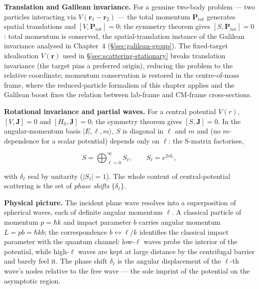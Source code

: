 \medskip\noindent\textbf{Translation and Galilean invariance.} For a genuine two-body problem --- two particles interacting via $V(\bm r_{1}-\bm r_{2})$ --- the total momentum $\bm P_{\mathrm{tot}}$ generates spatial translations and $[V,\bm P_{\mathrm{tot}}]=0$; the symmetry theorem gives $[S,\bm P_{\mathrm{tot}}]=0$: total momentum is conserved, the spatial-translation instance of the Galilean invariance analysed in Chapter~4 (\S\ref{sec:galilean-group}). The fixed-target idealisation $V(\bm r)$ used in \S\ref{sec:scattering-stationary} breaks translation invariance (the target pins a preferred origin), reducing the problem to the relative coordinate; momentum conservation is restored in the centre-of-mass frame, where the reduced-particle formalism of this chapter applies and the Galilean boost fixes the relation between lab-frame and CM-frame cross-sections.

\medskip\noindent\textbf{Rotational invariance and partial waves.} For a central potential $V(r)$, $[V,\bm J]=0$ and $[H_{0},\bm J]=0$; the symmetry theorem gives $[S,\bm J]=0$. In the angular-momentum basis $|E,\ell,m\rangle$, $S$ is diagonal in $\ell$ and $m$ and (no $m$-dependence for a scalar potential) depends only on $\ell$: the S-matrix factorises,
\begin{linenomath}
\begin{equation}
S=\bigoplus_{\ell=0}^{\infty}S_{\ell},\qquad S_{\ell}=e^{2i\delta_{\ell}},
\label{eq:Smatrix-partialwave}
\end{equation}
\end{linenomath}
with $\delta_{\ell}$ real by unitarity ($|S_{\ell}|=1$). The whole content of central-potential scattering is the set of \emph{phase shifts} $\{\delta_{\ell}\}$.

\medskip\noindent\textbf{Physical picture.} The incident plane wave resolves into a superposition of spherical waves, each of definite angular momentum $\ell$. A classical particle of momentum $p=\hbar k$ and impact parameter $b$ carries angular momentum $L=pb=\hbar kb$; the correspondence $b\leftrightarrow\ell/k$ identifies the classical impact parameter with the quantum channel: low-$\ell$ waves probe the interior of the potential, while high-$\ell$ waves are kept at large distance by the centrifugal barrier and barely feel it. The phase shift $\delta_{\ell}$ is the angular displacement of the $\ell$-th wave's nodes relative to the free wave --- the sole imprint of the potential on the asymptotic region.


